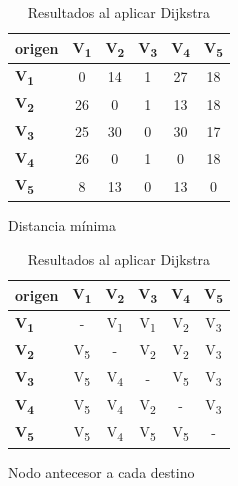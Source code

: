 \documentclass[../tp2_grupo404.tex]{subfiles}
\begin{document}
\begin{table}[H]
\begin{subtable}[H]{0.45\textwidth}
    \centering
    \begin{tabular}{@{}lccccc@{}}
    \toprule
    \textbf{origen} & \textbf{V\textsubscript{1}} & \textbf{V\textsubscript{2}} & \textbf{V\textsubscript{3}} & \textbf{V\textsubscript{4}} & \textbf{V\textsubscript{5}} \\ \midrule
    \textbf{V\textsubscript{1}}  & 0   & 14  & 1  & 27  & 18  \\
    \textbf{V\textsubscript{2}}  & 26  & 0   & 1  & 13  & 18  \\
    \textbf{V\textsubscript{3}}  & 25  & 30  & 0  & 30  & 17  \\
    \textbf{V\textsubscript{4}}  & 26  & 0   & 1  & 0   & 18  \\
    \textbf{V\textsubscript{5}}  & 8   & 13  & 0  & 13  & 0   \\ \bottomrule
    \end{tabular}
    \caption{Distancia mínima}
    \label{tab:DijkstraGrafoH_minimos}
\end{subtable}
\hfill
\begin{subtable}[H]{0.45\textwidth}
    \centering
    \begin{tabular}{@{}lccccc@{}}
    \toprule
    \textbf{origen} & \textbf{V\textsubscript{1}} & \textbf{V\textsubscript{2}} & \textbf{V\textsubscript{3}} & \textbf{V\textsubscript{4}} & \textbf{V\textsubscript{5}} \\ \midrule
    \textbf{V\textsubscript{1}}  & -                   & V\textsubscript{1}  & V\textsubscript{1}  & V\textsubscript{2}  & V\textsubscript{3}  \\
    \textbf{V\textsubscript{2}}  & V\textsubscript{5}  & -                   & V\textsubscript{2}  & V\textsubscript{2}  & V\textsubscript{3}  \\
    \textbf{V\textsubscript{3}}  & V\textsubscript{5}  & V\textsubscript{4}  & -                   & V\textsubscript{5}  & V\textsubscript{3}  \\
    \textbf{V\textsubscript{4}}  & V\textsubscript{5}  & V\textsubscript{4}  & V\textsubscript{2}  & -                   & V\textsubscript{3}  \\
    \textbf{V\textsubscript{5}}  & V\textsubscript{5}  & V\textsubscript{4}  & V\textsubscript{5}  & V\textsubscript{5}  & -                   \\ \bottomrule
    \end{tabular}
    \caption{Nodo antecesor a cada destino}
    \label{tab:DijkstraGrafoH_antecesor}
    \end{subtable}
\caption{Resultados al aplicar Dijkstra}
\label{tab:DijkstraGrafoH}
\end{table}
\end{document}
